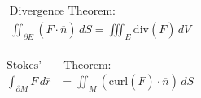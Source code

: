 \documentclass[12pt]{article}
\begin{document}
\begin{multicols}{2}

  \begin{equation*}
    \begin{split}
      \text{Divergence Theorem:}\\
      \iint_{\partial E}(\overline{F}\cdot\overline{n})\,dS=\iiint_E\text{div}(\overline{F})\,dV\\
    \end{split}
  \end{equation*}

  \begin{equation*}
    \begin{split}
    \text{Stokes'}& \text{ Theorem:}\\
      \int_{\partial M}\overline{F}\,d\overline{r}&=\iint_M(\text{curl}(\overline{F})\cdot\overline{n})\,dS\\
    \end{split}
  \end{equation*}

\end{multicols}
\end{document}
